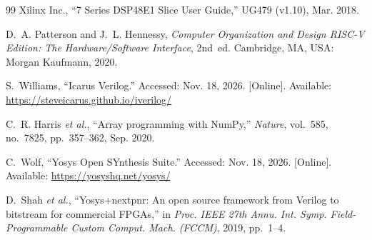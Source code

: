 \documentclass[conference]{IEEEtran}
\begin{document}
\begin{thebibliography}{99}
Xilinx Inc., ``7 Series DSP48E1 Slice User Guide,'' UG479 (v1.10), Mar. 2018.

D.~A. Patterson and J.~L. Hennessy, \emph{Computer Organization and Design
RISC-V Edition: The Hardware/Software Interface}, 2nd~ed. Cambridge, MA,
USA: Morgan Kaufmann, 2020.

S.~Williams, ``Icarus Verilog.'' Accessed: Nov. 18, 2026. [Online]. Available:
\url{https://steveicarus.github.io/iverilog/}

C.~R. Harris \emph{et al.}, ``Array programming with NumPy,'' \emph{Nature},
vol.~585, no.~7825, pp.~357--362, Sep. 2020.

C.~Wolf, ``Yosys Open SYnthesis Suite.'' Accessed: Nov. 18, 2026. [Online].
Available: \url{https://yosyshq.net/yosys/}

D.~Shah \emph{et al.}, ``Yosys+nextpnr: An open source framework from Verilog
to bitstream for commercial FPGAs,'' in \emph{Proc. IEEE 27th Annu. Int. Symp.
Field-Programmable Custom Comput. Mach. (FCCM)}, 2019, pp.~1--4.

\end{thebibliography}
\end{document}
